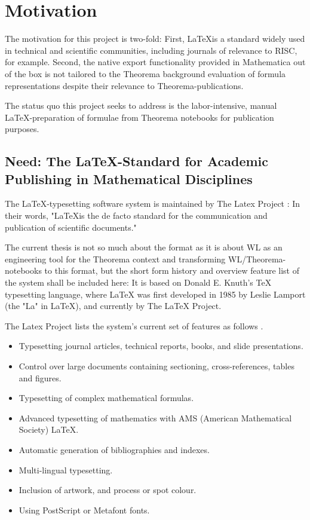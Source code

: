 \section{Motivation} \label{document-processing}

The motivation for this project is two-fold: First, \LaTeX is a standard widely used in technical and scientific communities, including journals of relevance to RISC, for example. Second, the native export functionality provided in Mathematica out of the box is not tailored to the Theorema background evaluation of formula representations despite their relevance to Theorema-publications. 

The status quo this project seeks to address is the labor-intensive, manual \LaTeX-preparation of formulae from Theorema notebooks for publication purposes.

\subsection{Need: The \LaTeX-Standard for Academic Publishing in Mathematical Disciplines}

The \LaTeX-typesetting software system is maintained by The Latex Project \cite{noauthor_latex_nodate}: In their words, "\LaTeX is the de facto standard for the communication and publication of scientific documents." \cite{noauthor_latex_nodate-1}

The current thesis is not so much about the format as it is about WL as an engineering tool for the Theorema context and transforming WL/Theorema-notebooks to this format, but the short form history and overview feature list of the system shall be included here: It is based on Donald E. Knuth’s TeX typesetting language, where LaTeX was first developed in 1985 by Leslie Lamport (the "La" in LaTeX), and currently by The LaTeX Project. \cite{noauthor_latex_nodate} 

The Latex Project lists the system's current set of features as follows \cite{noauthor_introduction_nodate}.

\begin{itemize}
    \item Typesetting journal articles, technical reports, books, and slide presentations.
    \item Control over large documents containing sectioning, cross-references, tables and figures.
    \item Typesetting of complex mathematical formulas.
    \item Advanced typesetting of mathematics with AMS (American Mathematical Society) LaTeX.
    \item Automatic generation of bibliographies and indexes.
    \item Multi-lingual typesetting.
    \item Inclusion of artwork, and process or spot colour.
    \item Using PostScript or Metafont fonts.
\end{itemize}

